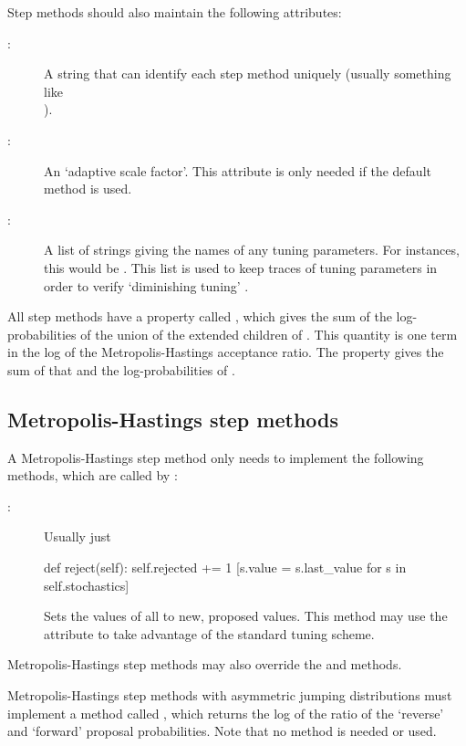 \documentclass[]{jss}
\begin{document}
Step methods should also maintain the following attributes:
\begin{description}
   \item[:] A string that can identify each step method uniquely (usually something like \\).
   \item[:] An `adaptive scale factor'. This attribute is only needed if the default  method is used.
   \item[:] A list of strings giving the names of any tuning parameters. For  instances, this would be . This list is used to keep traces of tuning parameters in order to verify `diminishing tuning' \citep{tuning}.
\end{description}

All step methods have a property called , which gives the sum of the log-probabilities of the union of the extended children of . This quantity is one term in the log of the Metropolis-Hastings acceptance ratio. The  property gives the sum of that and the log-probabilities of .  



\subsection{Metropolis-Hastings step methods} \label{user-metro}

A Metropolis-Hastings step method only needs to implement the following methods, which are called by :
\begin{description}
   \item[:] Usually just
   \begin{CodeInput}
def reject(self):
	self.rejected += 1
	[s.value = s.last_value for s in self.stochastics]
\end{CodeInput}
   \item[] Sets the values of all  to new, proposed values. This method may use the  attribute to take advantage of the standard tuning scheme.
\end{description}
Metropolis-Hastings step methods may also override the  and  methods.

Metropolis-Hastings step methods with asymmetric jumping distributions must implement a method called , which returns the log of the ratio of the `reverse' and `forward' proposal probabilities. Note that no  method is needed or used.
\end{document}
